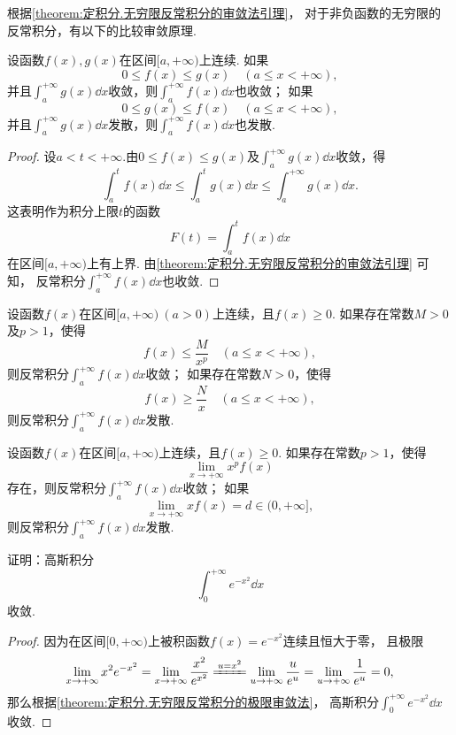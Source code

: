 根据\cref{theorem:定积分.无穷限反常积分的审敛法引理}，
对于非负函数的无穷限的反常积分，有以下的比较审敛原理.
\begin{theorem}[比较审敛原理]\label{theorem:定积分.无穷限反常积分的比较审敛原理}
设函数\(f(x),g(x)\)在区间\([a,+\infty)\)上连续.
如果\[
	0 \leq f(x) \leq g(x)
	\quad (a \leq x < +\infty),
\]并且\(\int_a^{+\infty} g(x) \dd{x}\)收敛，则\(\int_a^{+\infty} f(x) \dd{x}\)也收敛；
如果\[
	0 \leq g(x) \leq f(x)
	\quad (a \leq x < +\infty),
\]
并且\(\int_a^{+\infty} g(x) \dd{x}\)发散，则\(\int_a^{+\infty} f(x) \dd{x}\)也发散.
\begin{proof}
设\(a < t < +\infty\).由\(0 \leq f(x) \leq g(x)\)及\(\int_a^{+\infty} g(x) \dd{x}\)收敛，得\[
	\int_a^t f(x) \dd{x}
	\leq
	\int_a^t g(x) \dd{x}
	\leq
	\int_a^{+\infty} g(x) \dd{x}.
\]
这表明作为积分上限\(t\)的函数\[
	F(t) = \int_a^t f(x) \dd{x}
\]
在区间\([a,+\infty)\)上有上界.
由\cref{theorem:定积分.无穷限反常积分的审敛法引理} 可知，
反常积分\(\int_a^{+\infty} f(x) \dd{x}\)也收敛.
\end{proof}
\end{theorem}

\begin{theorem}[比较审敛法]\label{theorem:定积分.无穷限反常积分的比较审敛法}
设函数\(f(x)\)在区间\([a,+\infty)\ (a>0)\)上连续，且\(f(x) \geq 0\).
如果存在常数\(M>0\)及\(p>1\)，使得\[
f(x) \leq \frac{M}{x^p} \quad (a \leq x < +\infty),
\]则反常积分\(\int_a^{+\infty} f(x) \dd{x}\)收敛；
如果存在常数\(N>0\)，使得\[
f(x) \geq \frac{N}{x} \quad (a \leq x < +\infty),
\]则反常积分\(\int_a^{+\infty} f(x) \dd{x}\)发散.
\end{theorem}

\begin{theorem}[极限审敛法]\label{theorem:定积分.无穷限反常积分的极限审敛法}
设函数\(f(x)\)在区间\([a,+\infty)\)上连续，且\(f(x) \geq 0\).
如果存在常数\(p > 1\)，使得\[
\lim\limits_{x \to +\infty} x^p f(x)
\]存在，则反常积分\(\int_a^{+\infty} f(x) \dd{x}\)收敛；
如果\[
\lim\limits_{x \to +\infty} x f(x) = d \in (0,+\infty],
\]则反常积分\(\int_a^{+\infty} f(x) \dd{x}\)发散.
\end{theorem}

\begin{example}\label{example:定积分.高斯积分的收敛性}
证明：高斯积分\[
\int_0^{+\infty} e^{-x^2} \dd{x}
\]收敛.
\begin{proof}
因为在区间\([0,+\infty)\)上被积函数\(f(x) = e^{-x^2}\)连续且恒大于零，%
且极限\[
\lim\limits_{x\to+\infty} x^2 e^{-x^2}
= \lim\limits_{x\to+\infty} \frac{x^2}{e^{x^2}}
\xlongequal{u=x^2} \lim\limits_{u\to+\infty} \frac{u}{e^u}
= \lim\limits_{u\to+\infty} \frac{1}{e^u}
= 0,
\]
那么根据\cref{theorem:定积分.无穷限反常积分的极限审敛法}，%
高斯积分\(\int_0^{+\infty} e^{-x^2} \dd{x}\)收敛.
\end{proof}
\end{example}


